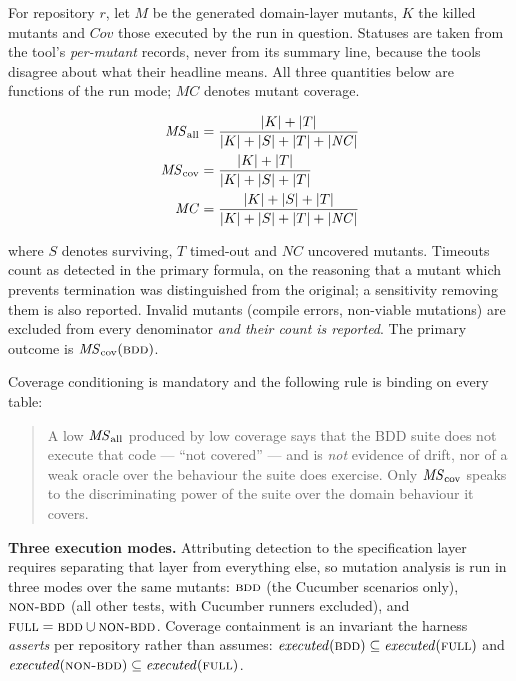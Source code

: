 For repository $r$, let $M$ be the generated domain-layer mutants, $K$ the killed mutants and
$\mathit{Cov}$ those executed by the run in question. Statuses are taken from the tool's
\emph{per-mutant} records, never from its summary line, because the tools disagree about what their
headline means. All three quantities below are functions of the run mode; $\mathit{MC}$ denotes
mutant coverage.

\begin{align}
\mathit{MS}_{\mathrm{all}} &= \frac{|K| + |T|}{|K| + |S| + |T| + |\mathit{NC}|} \label{eq:msall}\\
\mathit{MS}_{\mathrm{cov}} &= \frac{|K| + |T|}{|K| + |S| + |T|} \label{eq:mscov}\\
\mathit{MC} &= \frac{|K| + |S| + |T|}{|K| + |S| + |T| + |\mathit{NC}|} \label{eq:cov}
\end{align}

where $S$ denotes surviving, $T$ timed-out and $\mathit{NC}$ uncovered mutants. Timeouts count as
detected in the primary formula, on the reasoning that a mutant which prevents termination was
distinguished from the original; a sensitivity removing them is also reported. Invalid mutants
(compile errors, non-viable mutations) are excluded from every denominator \emph{and their count is
reported}. The primary outcome is $\mathit{MS}_{\mathrm{cov}}(\textsc{bdd})$.

Coverage conditioning is mandatory and the following rule is binding on every table:

\begin{quote}
\setlength{\rightmargin}{0pt}
\label{quot:coverage}
A low $\mathit{MS}_{\mathrm{all}}$ produced by low coverage says that the BDD suite does not execute that code --- ``not
covered'' --- and is \emph{not} evidence of drift, nor of a weak oracle over the behaviour the suite
does exercise. Only $\mathit{MS}_{\mathrm{cov}}$ speaks to the discriminating power of the suite over the domain
behaviour it covers.
\end{quote}

\textbf{Three execution modes.} Attributing detection to the specification layer requires
separating that layer from everything else, so mutation analysis is run in three modes over the same
mutants: $\textsc{bdd}$ (the Cucumber scenarios only), $\textsc{non-bdd}$ (all other tests, with Cucumber runners
excluded), and $\textsc{full} = \textsc{bdd} \cup \textsc{non-bdd}$. Coverage containment is an invariant the harness
\emph{asserts} per repository rather than assumes:
$\mathit{executed}(\textsc{bdd}) \subseteq \mathit{executed}(\textsc{full})$ and
$\mathit{executed}(\textsc{non-bdd}) \subseteq \mathit{executed}(\textsc{full})$.

